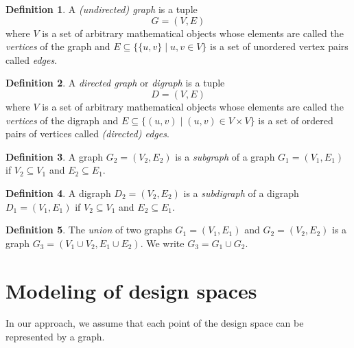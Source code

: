 \documentclass[times,a4paper,10pt,twocolumn]{article}
\theoremstyle{definition}
\newtheorem{definition}{Definition}[section]
\theoremstyle{definition}
\theoremstyle{plain}
\begin{document}
\begin{definition}

A \emph{(undirected) graph} is a tuple
\[
G = (V, E)
\]
where $V$ is a set of arbitrary mathematical objects whose elements are called
the \emph{vertices} of the graph and $E \subseteq \{\{u, v\} \mid u,v \in V\}$
is a set of unordered vertex pairs called \emph{edges}.

\end{definition}


\begin{definition}

A \emph{directed graph} or \emph{digraph} is a tuple
\[
D = (V, E)
\]
where $V$ is a set of arbitrary mathematical objects whose elements are called
the \emph{vertices} of the digraph and $E \subseteq \{(u, v)\mid (u, v) \in V
\times V\}$ is a set of ordered pairs of vertices called \emph{(directed)
edges}.

\end{definition}

\begin{definition}

A graph $G_2 = (V_2, E_2)$ is a \emph{subgraph} of a graph $G_1 = (V_1, E_1)$
if $V_2 \subseteq V_1$ and $E_2 \subseteq E_1$.

\end{definition}

\begin{definition}

A digraph $D_2 = (V_2, E_2)$ is a \emph{subdigraph} of a digraph $D_1 = (V_1,
E_1)$ if $V_2 \subseteq V_1$ and $E_2 \subseteq E_1$.

\end{definition}


\begin{definition}

The \emph{union} of two graphs $G_1 = (V_1, E_1)$ and $G_2 = (V_2, E_2)$ is a
graph $G_3 = (V_1 \cup V_2, E_1 \cup E_2)$. We write $G_3 = G_1 \cup G_2$.

\end{definition}





\section{Modeling of design spaces}

In our approach, we assume that each point of the design space can be
represented by a graph.
\end{document}
